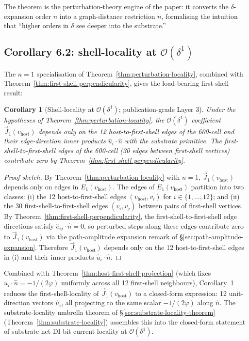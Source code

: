 \documentclass[11pt,letterpaper]{article}
\newtheorem{corollary}[theorem]{Corollary}
\newcommand{\phig}{\varphi}
\newcommand{\vhost}{v_{\text{host}}}
\newcommand{\bigO}[1]{\mathcal{O}(#1)}
\begin{document}
The theorem is the perturbation-theory engine of the paper: it converts the $\delta$-expansion order $n$ into a graph-distance restriction $n$, formalising the intuition that ``higher orders in $\delta$ see deeper into the substrate.''

\subsection{Corollary 6.2: shell-locality at $\bigO{\delta^1}$}
\label{sec:shell-locality-corollary}

The $n = 1$ specialisation of Theorem~\ref{thm:perturbation-locality}, combined with Theorem~\ref{thm:first-shell-perpendicularity}, gives the load-bearing first-shell result:

\begin{corollary}[Shell-locality at $\bigO{\delta^1}$; publication-grade Layer 3]
\label{cor:shell-locality}
Under the hypotheses of Theorem~\ref{thm:perturbation-locality}, the $\bigO{\delta^1}$ coefficient $\vec{J}_1(\vhost)$ depends only on the 12 host-to-first-shell edges of the 600-cell and their edge-direction inner products $\hat{u}_i \cdot \hat{n}$ with the substrate primitive. The first-shell-to-first-shell edges of the 600-cell (30 edges between first-shell vertices) contribute zero by Theorem~\ref{thm:first-shell-perpendicularity}.
\end{corollary}

\begin{proof}[Proof sketch]
By Theorem~\ref{thm:perturbation-locality} with $n = 1$, $\vec{J}_1(\vhost)$ depends only on edges in $E_1(\vhost)$. The edges of $E_1(\vhost)$ partition into two classes: (i) the 12 host-to-first-shell edges $(\vhost, v_i)$ for $i \in \{1, \ldots, 12\}$; and (ii) the 30 first-shell-to-first-shell edges $(v_i, v_j)$ between pairs of first-shell vertices. By Theorem~\ref{thm:first-shell-perpendicularity}, the first-shell-to-first-shell edge directions satisfy $\hat{e}_{ij} \cdot \hat{n} = 0$, so perturbed steps along these edges contribute zero to $\vec{J}_1(\vhost)$ via the path-amplitude expansion remark of \S\ref{sec:path-amplitude-expansion}. Therefore $\vec{J}_1(\vhost)$ depends only on the 12 host-to-first-shell edges in (i) and their inner products $\hat{u}_i \cdot \hat{n}$.
\end{proof}

Combined with Theorem~\ref{thm:host-first-shell-projection} (which fixes $\hat{u}_i \cdot \hat{n} = -1/(2\phig)$ uniformly across all 12 first-shell neighbours), Corollary~\ref{cor:shell-locality} reduces the first-shell-locality of $\vec{J}_1(\vhost)$ to a closed-form expression: 12 unit-direction vectors $\hat{u}_i$, all projecting to the same scalar $-1/(2\phig)$ along $\hat{n}$. The substrate-locality umbrella theorem of \S\ref{sec:substrate-locality-theorem} (Theorem~\ref{thm:substrate-locality}) assembles this into the closed-form statement of substrate net DI-bit current locality at $\bigO{\delta^1}$.
\end{document}
